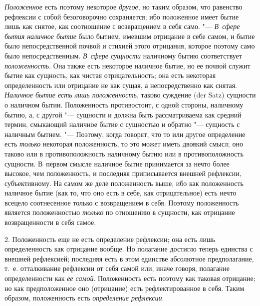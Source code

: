 {\em Положенное} есть поэтому некоторое
{\em другое}, но таким образом, что равенство рефлексии
с собой безоговорочно сохраняется; ибо положенное имеет бытие лишь как
снятое, как соотношение с возвращением в себя само. "---
{\em В~сфере бытия наличное бытие} было бытием, имевшим
отрицание в себе самом, и бытие было непосредственной почвой и стихией
этого отрицания, которое поэтому само было непосредственным.
{\em В~сфере сущности} наличному бытию соответствует
{\em положенность}. Она также есть некоторое наличное
бытие, но ее почвой служит бытие как сущность, как чистая отрицательность;
она есть некоторая определенность или отрицание не как сущая, а
непосредственно как снятая. {\em Наличное бытие есть
лишь положенность}, таково суждение (der Satz) сущности о наличном бытии.
Положенность противостоит, с одной стороны, наличному бытию, а, с другой
"--- сущности и должна быть рассматриваема как средний термин, смыкающий
наличное бытие с сущностью и обратно "--- сущность с наличным бытием. "---
Поэтому, когда говорят, что то или другое определение есть
{\em только} некоторая положенность, то это может иметь
двоякий смысл; оно таково или в противоположность наличному бытию или в
противоположность сущности. В~первом смысле наличное бытие принимается за
нечто более высокое, чем положенность, и последняя приписывается внешней
рефлексии, субъективному. На самом же деле положенность выше, ибо как
положенность наличное бытие (как то, что оно есть в себе, как
отрицательное) есть нечто всецело соотнесенное только с возвращением в
себя. Поэтому положенность является положенностью
{\em только} по отношению в сущности, как отрицание
возвращенности в себя самое.

2. Положенность еще не есть определение рефлексии; она есть лишь
определенность как отрицание вообще. Но полагание достигло теперь единства
с внешней рефлексией; последняя есть в этом единстве абсолютное
предполагание, т.~е. отталкивание рефлексии от себя самой или, иначе
говоря, полагание определенности как {\em ее самой}.
Положенность есть поэтому как таковая отрицание; но как предположенное оно
(отрицание) есть рефлектированное в себя. Таким образом, положенность есть
{\em определение рефлексии}.

